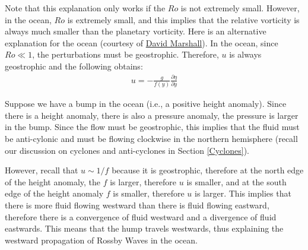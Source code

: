 Note that this explanation only works if the \(Ro\) is not extremely small. However, in the ocean, \(Ro\) is extremely small, and this implies that the relative vorticity is always much smaller than the planetary vorticity. Here is an alternative explanation for the ocean (courtesy of \href{https://www.physics.ox.ac.uk/our-people/marshalld}{David Marshall}). In the ocean, since \(Ro\ll 1\), the perturbations must be geostrophic. Therefore, \(u\) is always geostrophic and the following obtains:
\begin{align*}
    u = - \frac{g}{f(y)}\frac{\partial \eta}{\partial y}
\end{align*}

Suppose we have a bump in the ocean (i.e., a positive height anomaly). Since there is a height anomaly, there is also a pressure anomaly, the pressure is larger in the bump. Since the flow must be geostrophic, this implies that the fluid must be anti-cylonic and must be flowing clockwise in the northern hemisphere (recall our discussion on cyclones and anti-cyclones in Section \ref{Cyclones}).

However, recall that \(u\sim 1/f\) because it is geostrophic, therefore at the north edge of the height anomaly, the \(f\) is larger, therefore \(u\) is smaller, and at the south edge of the height anomaly \(f\) is smaller, therefore \(u\) is larger. This implies that there is more fluid flowing westward than there is fluid flowing eastward, therefore there is a convergence of fluid westward and a divergence of fluid eastwards. This means that the hump travels westwards, thus explaining the westward propagation of Rossby Waves in the ocean.

